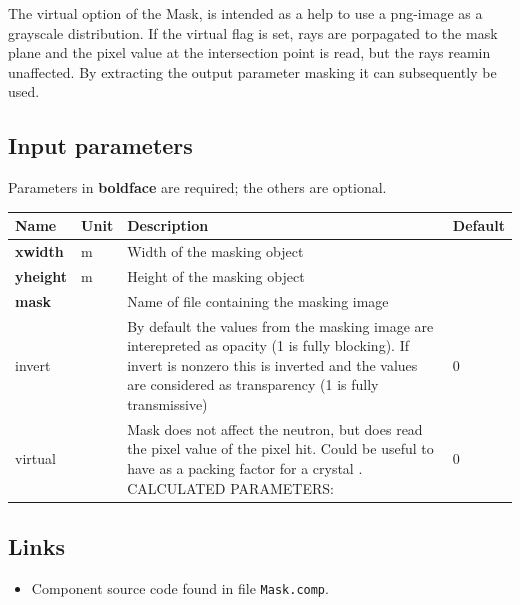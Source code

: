 The virtual option of the Mask, is intended as a help to use a png-image as a grayscale distribution. If the virtual flag is set, rays are porpagated to the mask plane and the pixel value at the intersection point is read, but the rays reamin unaffected. By extracting the output parameter masking it can subsequently be used.

\subsection*{Input parameters}
Parameters in \textbf{boldface} are required; the others are optional.

\begin{longtable}{p{}p{}p{}p{}}
\toprule
\textbf{Name} & \textbf{Unit} & \textbf{Description} & \textbf{Default} \\
\midrule
\endhead
\textbf{xwidth} & m & Width of the masking object &  \\
\textbf{yheight} & m & Height of the masking object &  \\
\textbf{mask} &   & Name of file containing the masking image &  \\
invert &   & By default the values from the masking image are interepreted as opacity (1 is fully blocking). If invert is nonzero this is inverted and the values are considered as transparency (1 is fully transmissive) & 0 \\
virtual &   & Mask does not affect the neutron, but does read the pixel value of the pixel hit. Could be useful to have as a packing factor for a crystal . CALCULATED PARAMETERS: & 0 \\
\bottomrule
\end{longtable}

\subsection*{Links}
\begin{itemize}
  \item Component source code found in file \texttt{Mask.comp}.
\end{itemize}
